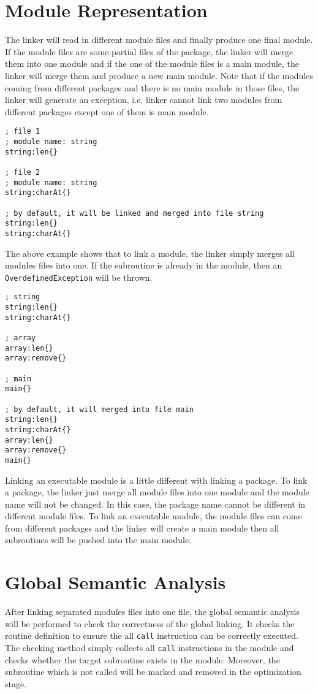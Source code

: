 \section{Module Representation}
The linker will read in different module files and finally produce one final module. If the module files are some partial files of the package, the linker will merge them into one module and if the one of the module files is a main module, the linker will merge them and produce a new main module. Note that if the modules coming from different packages and there is no main module in those files, the linker will generate an exception, i.e. linker cannot link two modules from different packages except one of them is main module.
\begin{lstlisting}[language=LucyX]
; file 1
; module name: string
string:len{}

; file 2
; module name: string
string:charAt{}

; by default, it will be linked and merged into file string
string:len{}
string:charAt{}
\end{lstlisting}
The above example shows that to link a module, the linker simply merges all modules files into one. If the subroutine is already in the module, then an \texttt{OverdefinedException} will be thrown.
\begin{lstlisting}[language=LucyX]
; string
string:len{}
string:charAt{}

; array
array:len{}
array:remove{}

; main
main{}

; by default, it will merged into file main
string:len{}
string:charAt{}
array:len{}
array:remove{}
main{}
\end{lstlisting}
Linking an executable module is a little different with linking a package. To link a package, the linker just merge all module files into one module and the module name will not be changed. In this case, the package name cannot be different in different module files. To link an executable module, the module files can come from different packages and the linker will create a main module then all subroutines will be pushed into the main module.

\section{Global Semantic Analysis}
After linking separated modules files into one file, the global semantic analysis will be performed to check the correctness of the global linking. It checks the routine definition to ensure the all \texttt{call} instruction can be correctly executed. \\
The checking method simply collects all \texttt{call} instructions in the module and checks whether the target subroutine exists in the module. Moreover, the subroutine which is not called will be marked and removed in the optimization stage.
